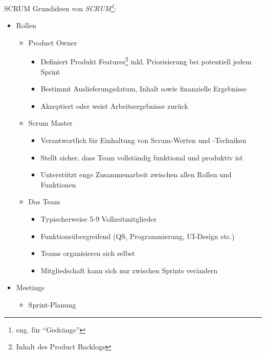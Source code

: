\begin{defi}{SCRUM}
    Grundideen von \emph{SCRUM\footnote{eng. für \enquote{Gedränge}}}:
    \begin{itemize}
        \item Rollen
              \begin{itemize}
                  \item Product Owner
                        \begin{itemize}
                            \item Definiert Produkt Features\footnote{Inhalt des Product Backlogs} inkl. Priorisierung bei potentiell jedem Sprint
                            \item Bestimmt Auslieferungsdatum, Inhalt sowie finanzielle Ergebnisse
                            \item Akzeptiert oder weist Arbeitsergebnisse zurück
                        \end{itemize}
                  \item Scrum Master
                        \begin{itemize}
                            \item Verantwortlich für Einhaltung von Scrum-Werten und -Techniken
                            \item Stellt sicher, dass Team vollständig funktional und produktiv ist
                            \item Unterstützt enge Zusammenarbeit zwischen allen Rollen und Funktionen
                        \end{itemize}
                  \item Das Team
                        \begin{itemize}
                            \item Typischerweise 5-9 Vollzeitmitglieder
                            \item Funktionsübergreifend (QS, Programmierung, UI-Design etc.)
                            \item Teams organisieren sich selbst
                            \item Mitgliedschaft kann sich nur zwischen Sprints verändern
                        \end{itemize}
              \end{itemize}
        \item Meetings
              \begin{itemize}
                  \item Sprint-Planung

\end{itemize}
\end{itemize}
\end{defi}
